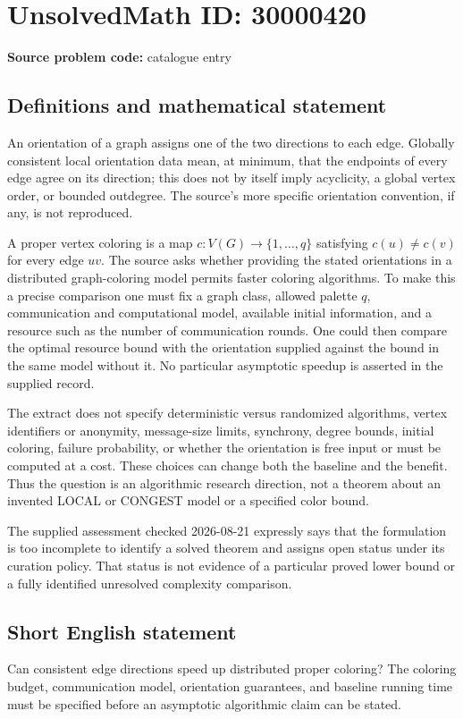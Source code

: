 \documentclass[11pt]{article}
\begin{document}
\section*{UnsolvedMath ID: 30000420}
\textbf{Source problem code:} catalogue entry
\subsection{Definitions and mathematical statement}
An orientation of a graph assigns one of the two directions to each edge. Globally consistent local orientation data mean, at minimum, that the endpoints of every edge agree on its direction; this does not by itself imply acyclicity, a global vertex order, or bounded outdegree. The source's more specific orientation convention, if any, is not reproduced.

A proper vertex coloring is a map \(c:V(G)\to\{1,\ldots,q\}\) satisfying \(c(u)\ne c(v)\) for every edge \(uv\). The source asks whether providing the stated orientations in a distributed graph-coloring model permits faster coloring algorithms. To make this a precise comparison one must fix a graph class, allowed palette \(q\), communication and computational model, available initial information, and a resource such as the number of communication rounds. One could then compare the optimal resource bound with the orientation supplied against the bound in the same model without it. No particular asymptotic speedup is asserted in the supplied record.

The extract does not specify deterministic versus randomized algorithms, vertex identifiers or anonymity, message-size limits, synchrony, degree bounds, initial coloring, failure probability, or whether the orientation is free input or must be computed at a cost. These choices can change both the baseline and the benefit. Thus the question is an algorithmic research direction, not a theorem about an invented LOCAL or CONGEST model or a specified color bound.

The supplied assessment checked 2026-08-21 expressly says that the formulation is too incomplete to identify a solved theorem and assigns open status under its curation policy. That status is not evidence of a particular proved lower bound or a fully identified unresolved complexity comparison.
\subsection{Short English statement}
Can consistent edge directions speed up distributed proper coloring? The coloring budget, communication model, orientation guarantees, and baseline running time must be specified before an asymptotic algorithmic claim can be stated.
\end{document}
